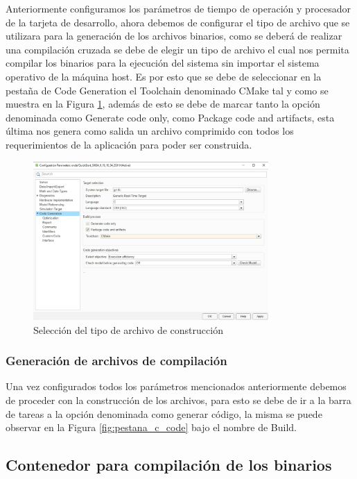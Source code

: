 Anteriormente configuramos los parámetros de tiempo de operación y procesador de la tarjeta de desarrollo, ahora debemos de configurar el tipo de archivo que se utilizara para la generación de los archivos binarios, como se deberá de realizar una compilación cruzada se debe de elegir un tipo de archivo el cual nos permita compilar los binarios para la ejecución del sistema sin importar el sistema operativo de la máquina host. Es por esto que se debe de seleccionar en la pestaña de Code Generation el Toolchain denominado CMake tal y como se muestra en la Figura \ref{fig:pestana_config_output_file}, además de esto se debe de marcar tanto la opción denominada como Generate code only, como Package code and artifacts, esta última nos genera como salida un archivo comprimido con todos los requerimientos de la aplicación para poder ser construida.


\begin{figure}[h!]
    \centering
    \includegraphics[width=0.8\textwidth]{fig/especifico_2/paso_a_paso_mtmt/configuration_output_file.png}
    \caption{Selección del tipo de archivo de construcción}
    \label{fig:pestana_config_output_file}
\end{figure}

\subsubsection{Generación de archivos de compilación}

Una vez configurados todos los parámetros mencionados anteriormente debemos de proceder con la construcción de los archivos, para esto se debe de ir a la barra de tareas a la opción denominada como generar código, la misma se puede observar en la Figura \ref{fig:pestana_c_code} bajo el nombre de Build.

\subsection{Contenedor para compilación de los binarios}

